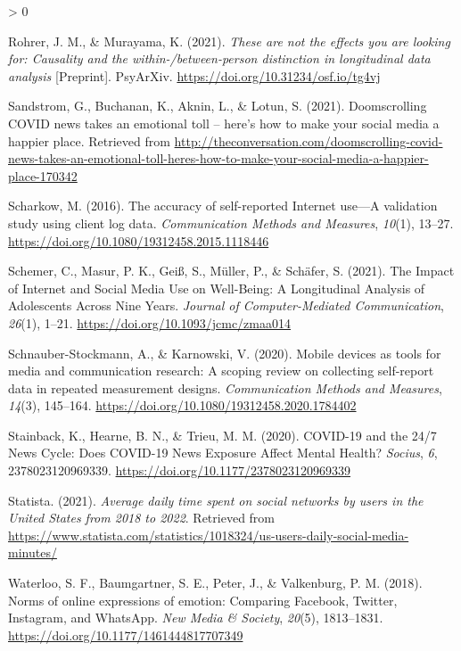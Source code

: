 \documentclass[
  english,
  man,floatsintext]{apa6}
\newlength{\cslhangindent}
\newenvironment{CSLReferences}[2] %
 {%
  \setlength{\parindent}{0pt}
  \ifodd #1 \everypar{\setlength{\hangindent}{\cslhangindent}}\ignorespaces\fi
  \ifnum #2 > 0
  \setlength{\parskip}{#2\baselineskip}
  \fi
 }%
 {}
\begin{document}
\begin{CSLReferences}{1}{0}
\leavevmode\hypertarget{ref-rohrerTheseAreNot2021}{}%
Rohrer, J. M., \& Murayama, K. (2021). \emph{These are not the effects you are looking for: {Causality} and the within-/between-person distinction in longitudinal data analysis} {[}Preprint{]}. PsyArXiv. \url{https://doi.org/10.31234/osf.io/tg4vj}

\leavevmode\hypertarget{ref-sandstromDoomscrollingCOVIDNews2021}{}%
Sandstrom, G., Buchanan, K., Aknin, L., \& Lotun, S. (2021). Doomscrolling {COVID} news takes an emotional toll -- here's how to make your social media a happier place. Retrieved from \url{http://theconversation.com/doomscrolling-covid-news-takes-an-emotional-toll-heres-how-to-make-your-social-media-a-happier-place-170342}

\leavevmode\hypertarget{ref-scharkowAccuracySelfreportedInternet2016}{}%
Scharkow, M. (2016). The accuracy of self-reported {Internet} use---{A} validation study using client log data. \emph{Communication Methods and Measures}, \emph{10}(1), 13--27. \url{https://doi.org/10.1080/19312458.2015.1118446}

\leavevmode\hypertarget{ref-schemerImpactInternetSocial2021}{}%
Schemer, C., Masur, P. K., Geiß, S., Müller, P., \& Schäfer, S. (2021). The {Impact} of {Internet} and {Social} {Media} {Use} on {Well}-{Being}: {A} {Longitudinal} {Analysis} of {Adolescents} {Across} {Nine} {Years}. \emph{Journal of Computer-Mediated Communication}, \emph{26}(1), 1--21. \url{https://doi.org/10.1093/jcmc/zmaa014}

\leavevmode\hypertarget{ref-schnauber-stockmannMobileDevicesTools2020}{}%
Schnauber-Stockmann, A., \& Karnowski, V. (2020). Mobile devices as tools for media and communication research: {A} scoping review on collecting self-report data in repeated measurement designs. \emph{Communication Methods and Measures}, \emph{14}(3), 145--164. \url{https://doi.org/10.1080/19312458.2020.1784402}

\leavevmode\hypertarget{ref-stainbackCOVID1924News2020}{}%
Stainback, K., Hearne, B. N., \& Trieu, M. M. (2020). {COVID}-19 and the 24/7 {News} {Cycle}: {Does} {COVID}-19 {News} {Exposure} {Affect} {Mental} {Health}? \emph{Socius}, \emph{6}, 2378023120969339. \url{https://doi.org/10.1177/2378023120969339}

\leavevmode\hypertarget{ref-statistaAverageDailyTime2021}{}%
Statista. (2021). \emph{Average daily time spent on social networks by users in the {United} {States} from 2018 to 2022}. Retrieved from \url{https://www.statista.com/statistics/1018324/us-users-daily-social-media-minutes/}

\leavevmode\hypertarget{ref-waterlooNormsOnlineExpressions2018}{}%
Waterloo, S. F., Baumgartner, S. E., Peter, J., \& Valkenburg, P. M. (2018). Norms of online expressions of emotion: {Comparing} {Facebook}, {Twitter}, {Instagram}, and {WhatsApp}. \emph{New Media \& Society}, \emph{20}(5), 1813--1831. \url{https://doi.org/10.1177/1461444817707349}

\end{CSLReferences}
\end{document}
